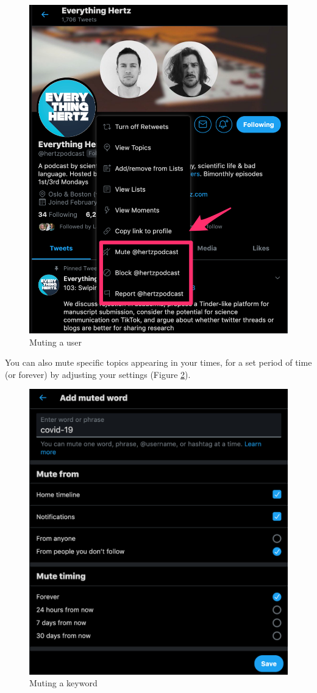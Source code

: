 \documentclass[]{book}
\begin{document}
\begin{figure}

{\centering \includegraphics[width=0.8\linewidth]{images/mute} 

}

\caption{Muting a user}\label{fig:mute}
\end{figure}

You can also mute specific topics appearing in your times, for a set period of time (or forever) by adjusting your settings (Figure \ref{fig:mute-word}).

\begin{figure}

{\centering \includegraphics[width=0.8\linewidth]{images/mute_word} 

}

\caption{Muting a keyword}\label{fig:mute-word}
\end{figure}
\end{document}
